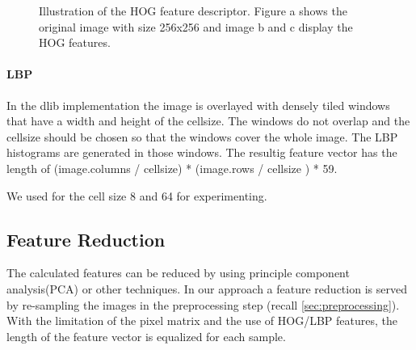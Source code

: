 \documentclass[a4paper,10pt]{article}
\begin{document}
\begin{figure} [htb] 
	\centering 
	\caption{Illustration of the HOG feature descriptor. Figure a shows the original image with size 256x256 and image b and c display the HOG features.} 
	\label{fig:hog} 
\end{figure}

\paragraph{LBP}
In the dlib implementation the image is overlayed with densely tiled windows that have a width and height of the cellsize. The windows do not overlap and the cellsize should be chosen so that the windows cover the whole image. The LBP histograms are generated in those windows. 
The resultig feature vector has the length of (image.columns / cellsize)  * (image.rows / cellsize ) * 59.

We used for the cell size 8 and 64 for experimenting.

\subsection{Feature Reduction}

The calculated features can be reduced by using principle component analysis(PCA) or other techniques.
In our approach a feature reduction is served by re-sampling the images in the preprocessing step (recall \autoref{sec:preprocessing}).
With the limitation of the pixel matrix and the use of HOG/LBP features, the length of the feature vector is equalized for each sample.
\end{document}
